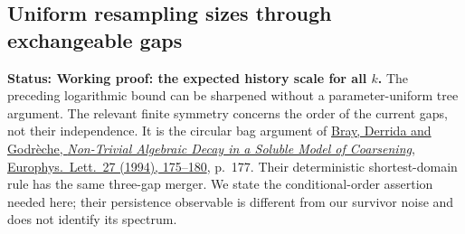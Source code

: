 \documentclass[11pt,letterpaper]{article}
\newcommand{\status}[1]{\textbf{Status: #1.}}
\begin{document}
\subsection{Uniform resampling sizes through exchangeable gaps}
\label{sec:growing-perturbations}

\status{Working proof: the expected history scale for all $k$}
The preceding logarithmic bound can be sharpened without a
parameter-uniform tree argument. The relevant finite symmetry concerns
the order of the current gaps, not their independence.
It is the circular bag argument of
\href{https://www.phys.ens.psl.eu/~derrida/PAPIERS/1994/bray-epl.pdf}
{Bray, Derrida and Godr\`eche, \emph{Non-Trivial Algebraic Decay in a
Soluble Model of Coarsening}, Europhys.\ Lett.\ 27 (1994), 175--180},
p.~177. Their deterministic shortest-domain rule has the same
three-gap merger. We state the conditional-order assertion needed
here; their persistence observable is different from our survivor
noise and does not identify its spectrum.
\end{document}
